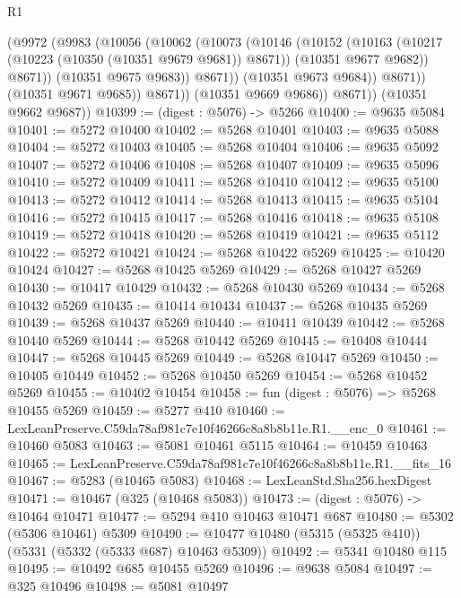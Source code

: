 \begin{lexlean}{R1}
\begin{coremodule}
                    (@9972
                      (@9983
                        (@10056
                          (@10062
                            (@10073
                              (@10146
                                (@10152
                                  (@10163
                                    (@10217 (@10223 (@10350 (@10351 @9679 @9681)) @8671))
                                    (@10351 @9677 @9682))
                                  @8671))
                              (@10351 @9675 @9683))
                            @8671))
                        (@10351 @9673 @9684))
                      @8671))
                  (@10351 @9671 @9685))
                @8671))
            (@10351 @9669 @9686))
          @8671))
      (@10351 @9662 @9687))
@10399 := (digest : @5076) -> @5266
@10400 := @9635 @5084
@10401 := @5272 @10400
@10402 := @5268 @10401
@10403 := @9635 @5088
@10404 := @5272 @10403
@10405 := @5268 @10404
@10406 := @9635 @5092
@10407 := @5272 @10406
@10408 := @5268 @10407
@10409 := @9635 @5096
@10410 := @5272 @10409
@10411 := @5268 @10410
@10412 := @9635 @5100
@10413 := @5272 @10412
@10414 := @5268 @10413
@10415 := @9635 @5104
@10416 := @5272 @10415
@10417 := @5268 @10416
@10418 := @9635 @5108
@10419 := @5272 @10418
@10420 := @5268 @10419
@10421 := @9635 @5112
@10422 := @5272 @10421
@10424 := @5268 @10422 @5269
@10425 := @10420 @10424
@10427 := @5268 @10425 @5269
@10429 := @5268 @10427 @5269
@10430 := @10417 @10429
@10432 := @5268 @10430 @5269
@10434 := @5268 @10432 @5269
@10435 := @10414 @10434
@10437 := @5268 @10435 @5269
@10439 := @5268 @10437 @5269
@10440 := @10411 @10439
@10442 := @5268 @10440 @5269
@10444 := @5268 @10442 @5269
@10445 := @10408 @10444
@10447 := @5268 @10445 @5269
@10449 := @5268 @10447 @5269
@10450 := @10405 @10449
@10452 := @5268 @10450 @5269
@10454 := @5268 @10452 @5269
@10455 := @10402 @10454
@10458 := fun (digest : @5076) => @5268 @10455 @5269
@10459 := @5277 @410
@10460 := LexLeanPreserve.C59da78af981c7e10f46266c8a8b8b11e.R1.__enc_0
@10461 := @10460 @5083
@10463 := @5081 @10461 @5115
@10464 := @10459 @10463
@10465 := LexLeanPreserve.C59da78af981c7e10f46266c8a8b8b11e.R1.__fits_16
@10467 := @5283 (@10465 @5083)
@10468 := LexLeanStd.Sha256.hexDigest
@10471 := @10467 (@325 (@10468 @5083))
@10473 := (digest : @5076) -> @10464 @10471
@10477 := @5294 @410 @10463 @10471 @687
@10480 := @5302 (@5306 @10461) @5309
@10490 := @10477 @10480 (@5315 (@5325 @410)) (@5331 (@5332 (@5333 @687) @10463 @5309))
@10492 := @5341 @10480 @115
@10495 := @10492 @685 @10455 @5269
@10496 := @9638 @5084
@10497 := @325 @10496
@10498 := @5081 @10497

\end{coremodule}
\end{lexlean}
